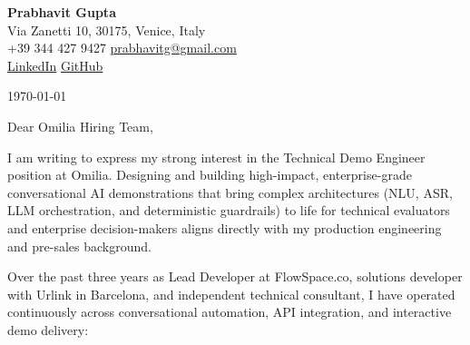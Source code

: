 \documentclass[11pt,a4paper]{article}
\begin{document}
\begin{center}
    {\huge \textbf{Prabhavit Gupta}} \\
    \vspace{4pt}
    Via Zanetti 10, 30175, Venice, Italy \\
    +39 344 427 9427 \textbar{} \href{mailto:prabhavitg@gmail.com}{prabhavitg@gmail.com} \\
    \href{https://www.linkedin.com/in/prabhavit/}{LinkedIn} \textbar{} \href{https://github.com/prab-gupta}{GitHub}
\end{center}

\vspace{10pt}

\noindent \today

\vspace{6pt}

\noindent Dear Omilia Hiring Team,

\vspace{6pt}

\noindent I am writing to express my strong interest in the Technical Demo Engineer position at Omilia. Designing and building high-impact, enterprise-grade conversational AI demonstrations that bring complex architectures (NLU, ASR, LLM orchestration, and deterministic guardrails) to life for technical evaluators and enterprise decision-makers aligns directly with my production engineering and pre-sales background.

\noindent Over the past three years as Lead Developer at FlowSpace.co, solutions developer with Urlink in Barcelona, and independent technical consultant, I have operated continuously across conversational automation, API integration, and interactive demo delivery:
\end{document}
